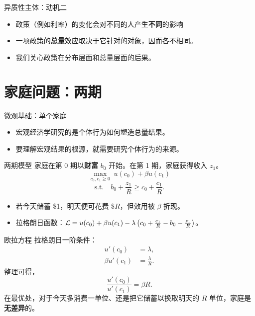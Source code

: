 \documentclass[10pt,aspectratio=169]{beamer}
\begin{document}
\begin{frame}{异质性主体：动机二}
\begin{itemize}
  \item 政策（例如利率）的变化会对不同的人产生\textbf{不同}的影响
  \item 一项政策的\textbf{总量}效应取决于它针对的对象，因而各不相同。
  \item 我们关心政策在分布层面和总量层面的后果。
\end{itemize}

\end{frame}

\section{家庭问题：两期}

\begin{frame}{微观基础：单个家庭}
  \begin{itemize}
    \item 宏观经济学研究的是个体行为如何塑造总量结果。
    \item 要理解宏观结果的根源，就需要研究个体行为的来源。
  \end{itemize}
\end{frame}

\begin{frame}{两期模型}
  家庭在第 0 期以\textbf{财富} $b_0$ 开始。在第 1 期，家庭获得收入 $z_1$。
  \[
    \max_{c_0, c_1 \ge 0} \; u(c_0) + \beta u(c_1)
  \]
  \[
    \text{s.t.}\quad b_0 + \frac{z_1}{R} \geq c_0 + \frac{c_1}{R}.
  \]
  \begin{itemize}
    \item 若今天储蓄 \$1，明天便可花费 \$$R$，但效用被 $\beta$ 折现。
    \item 拉格朗日函数：$\mathcal{L} = u(c_0) + \beta u(c_1) - \lambda\left( c_0 + \frac{c_1}{R} - b_0 - \frac{z_1}{R} \right)$。
  \end{itemize}
\end{frame}

\begin{frame}{欧拉方程}
  拉格朗日一阶条件：
  \begin{align*}
    u'(c_0) &= \lambda, \\
    \beta u'(c_1) &= \frac{\lambda}{R}.
  \end{align*}
  整理可得，
  \[
    \boxed{\frac{u'(c_0)}{u'(c_1)} = \beta R.}
  \]
  在最优处，对于今天多消费一单位、还是把它储蓄以换取明天的 $R$ 单位，家庭是\textbf{无差异}的。
\end{frame}
\end{document}
